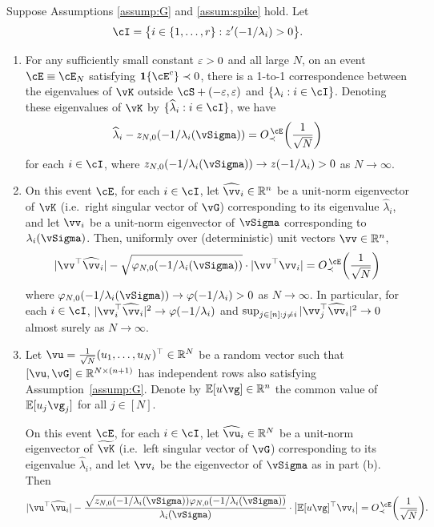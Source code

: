 \begin{theorem}\label{thm:spiked}
Suppose Assumptions \ref{assump:G} and \ref{assum:spike} hold. Let
\[\cI=\big\{i \in \{1,\ldots,r\}:z'(-1/\lambda_i)>0\big\}.\]
\begin{enumerate}[label=(\alph*)]
\item For any sufficiently small constant $\varepsilon>0$ and all large $N$,
on an event $\cE \equiv \cE_N$ satisfying $\bI\{\cE^c\} \prec 0$,
there is a 1-to-1 correspondence between the eigenvalues of
$\vK$ outside $\cS+(-\eps,\eps)$ and $\{\lambda_i:i \in \cI\}$.
Denoting these eigenvalues of $\vK$ by
$\{\widehat \lambda_i:i \in \cI\}$, we have
\[\widehat \lambda_i-z_{N,0}(-1/\lambda_i(\vSigma))=\SDcE{\frac{1}{\sqrt{N}}}\]
for each $i \in \cI$, where
$z_{N,0}(-1/\lambda_i(\vSigma)) \to z(-1/\lambda_i)>0$ as $N \to \infty$.
\item On this event $\cE$, for each $i \in \cI$, let $\widehat \vv_i \in \R^n$
be a unit-norm eigenvector of $\vK$ (i.e.\ right singular vector of $\vG$)
corresponding to its eigenvalue $\widehat \lambda_i$, and let $\vv_i$ be a unit-norm
eigenvector of $\vSigma$ corresponding to $\lambda_i(\vSigma)$.
Then, uniformly over (deterministic) unit vectors $\vv\in\R^n$,
\begin{align}
|\vv^\top \widehat\vv_i|-\sqrt{\varphi_{N,0}
({-}1/\lambda_i(\vSigma))} \cdot |\vv^\top\vv_i|=\SDcE{\frac{1}{\sqrt{N}}}
\end{align}
where $\varphi_{N,0}({-}1/\lambda_i(\vSigma)) \to \varphi({-}1/\lambda_i)>0$
as $N \to \infty$. In particular, for each $i \in \cI$,
$|\vv_i^\top\widehat{\vv}_i|^2 \to \varphi({-}1/\lambda_i)$
and $\sup_{j \in [n]:j \neq i} |\vv_j^\top\widehat{\vv}_i|^2 \to 0$
almost surely as $N \to \infty$.
\item Let $\vu=\frac{1}{\sqrt{N}}(u_1,\ldots,u_N)^\top \in\R^N$ be a random
vector such that $[\vu,\vG] \in \R^{N \times (n+1)}$ has independent rows
also satisfying Assumption~\ref{assump:G}. Denote by $\E[u\vg] \in \R^n$
the common value of $\E[u_j\vg_j]$ for all $j \in [N]$.

On this event $\cE$, for each $i \in \cI$, let $\widehat \vu_i \in \R^N$ be a unit-norm
eigenvector of $\widetilde\vK$ (i.e.\ left singular vector of $\vG$)
corresponding to its eigenvalue $\widehat \lambda_i$,
and let $\vv_i$ be the eigenvector of $\vSigma$ as in part (b). Then
\begin{align}
|\vu^\top\widehat{\vu}_i|-
\frac{\sqrt{z_{N,0}(-1/\lambda_i(\vSigma))\varphi_{N,0}({-}1/\lambda_i(\vSigma))}}{\lambda_i(\vSigma)}\cdot\left|\E[u\vg]^\top\vv_i\right|=\SDcE{\frac{1}{\sqrt{N}}}.
\end{align}
\end{enumerate} 
\end{theorem}


